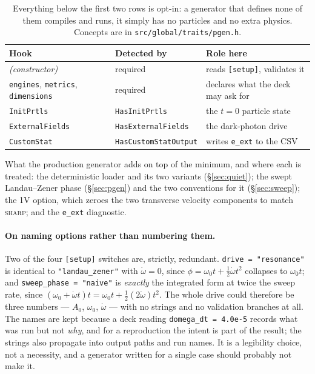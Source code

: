 \documentclass[11pt,a4paper]{article}
\newcommand{\code}[1]{\texttt{\small #1}}
\begin{document}
\begin{table}[h]
\centering\small
\begin{tabular}{@{}lll@{}}
\toprule
Hook & Detected by & Role here \\
\midrule
\emph{(constructor)}  & required           & reads \code{[setup]}, validates it \\
\code{engines}, \code{metrics}, \code{dimensions} & required & declares what the deck may ask for \\
\code{InitPrtls}      & \code{HasInitPrtls}      & the $t=0$ particle state \\
\code{ExternalFields} & \code{HasExternalFields} & the dark-photon drive \\
\code{CustomStat}     & \code{HasCustomStatOutput}     & writes \code{e\_ext} to the CSV \\
\bottomrule
\end{tabular}
\caption{Everything below the first two rows is opt-in: a generator that defines none
of them compiles and runs, it simply has no particles and no extra physics. Concepts
are in \code{src/global/traits/pgen.h}.}
\end{table}

What the production generator adds on top of the minimum, and where each is treated:
the deterministic loader and its two variants (\S\ref{sec:quiet}); the swept
Landau--Zener phase (\S\ref{sec:pgen}) and the two conventions for it
(\S\ref{sec:sweep}); the 1V option, which zeroes the two transverse velocity
components to match \textsc{sharp}; and the \code{e\_ext} diagnostic.

\paragraph{On naming options rather than numbering them.} Two of the four
\code{[setup]} switches are, strictly, redundant. \code{drive = "resonance"} is
identical to \code{"landau\_zener"} with $\dot\omega=0$, since
$\phi = \omega_0 t + \tfrac12\dot\omega t^2$ collapses to $\omega_0 t$; and
\code{sweep\_phase = "naive"} is \emph{exactly} the integrated form at twice the
sweep rate, since $(\omega_0 + \dot\omega t)t = \omega_0 t +
\tfrac12(2\dot\omega)t^2$. The whole drive could therefore be three numbers ---
$A_0$, $\omega_0$, $\dot\omega$ --- with no strings and no validation branches at
all. The names are kept because a deck reading \code{domega\_dt = 4.0e-5} records
what was run but not \emph{why}, and for a reproduction the intent is part of the
result; the strings also propagate into output paths and run names. It is a
legibility choice, not a necessity, and a generator written for a single case should
probably not make it.
\end{document}
